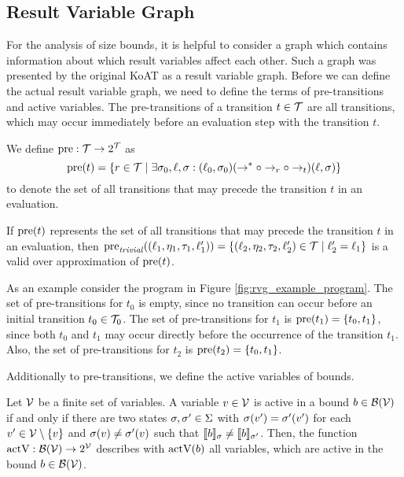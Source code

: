 \subsection{Result Variable Graph}

For the analysis of size bounds, it is helpful to consider a graph which contains information about which result variables affect each other.
Such a graph was presented by the original KoAT \cite{koat} as a result variable graph.
Before we can define the actual result variable graph, we need to define the terms of pre-transitions and active variables.
The pre-transitions of a transition $t \in \mathcal{T}$ are all transitions, which may occur immediately before an evaluation step with the transition $t$.

\begin{definition} 
  We define $\text{pre}: \mathcal{T} \rightarrow 2^{\mathcal{T}}$ as
  \[\text{pre}(t) = \lbrace r \in \mathcal{T} \mid \exists \sigma_0, \ell, \sigma: (\ell_0, \sigma_0) (\rightarrow^* \circ \rightarrow_r \circ \rightarrow_{t}) (\ell, \sigma) \rbrace\]
  to denote the set of all transitions that may precede the transition $t$ in an evaluation.	
\end{definition}

If $\text{pre}(t)$ represents the set of all transitions that may precede the transition $t$ in an evaluation, then $\text{pre}_{\mathit{trivial}}((\ell_1, \eta_1, \tau_1, \ell_1')) = \lbrace (\ell_2, \eta_2, \tau_2, \ell_2') \in \mathcal{T} \mid \ell_2' = \ell_1 \rbrace$ is a valid over approximation of $\text{pre}(t)$.



As an example consider the program in Figure \ref{fig:rvg_example_program}.
The set of pre-transitions for $t_0$ is empty, since no transition can occur before an initial transition $t_0 \in \mathcal{T}_0$.
The set of pre-transitions for $t_1$ is $\text{pre}(t_1) = \lbrace t_0, t_1 \rbrace$, since both $t_0$ and $t_1$ may occur directly before the occurrence of the transition $t_1$.
Also, the set of pre-transitions for $t_2$ is $\text{pre}(t_2) = \lbrace t_0, t_1 \rbrace$.

Additionally to pre-transitions, we define the active variables of bounds. 

\begin{definition}
  Let $\mathcal{V}$ be a finite set of variables.  
  A variable $v \in \mathcal{V}$ is active in a bound $b \in \mathcal{B}(\mathcal{V})$ if and only if there are two states $\sigma, \sigma' \in \Sigma$ with $\sigma(v') = \sigma'(v')$ for each $v' \in \mathcal{V} \setminus \lbrace v \rbrace$ and $\sigma(v) \neq \sigma'(v)$ such that $\llbracket b \rrbracket_{\sigma} \neq \llbracket b \rrbracket_{\sigma'}$.
  Then, the function $\text{actV}: \mathcal{B}(\mathcal{V}) \rightarrow 2^{\mathcal{V}}$ describes with $\text{actV}(b)$ all variables, which are active in the bound $b \in \mathcal{B}(\mathcal{V})$.
\end{definition}

